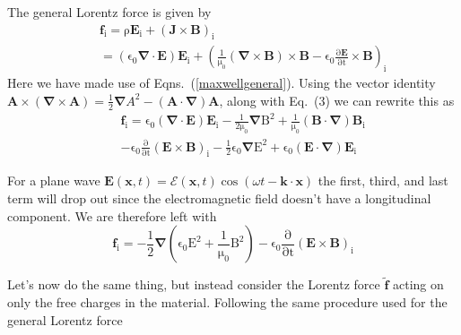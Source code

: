 The general Lorentz force is given by
\begin{eqnarray}
&&\mathrm{\mathbf{f}_i=\rho \mathbf{E}_i+\left(\mathbf{J} \times \mathbf{B}\right)_i}\nonumber \\
&&=\mathrm{\left(\epsilon_0\mathbf{\nabla} \cdot \mathbf{E}\right)\mathbf{E}_i+\left(\frac{1}{\mu_0}\left(\mathbf{\nabla}\times \mathbf{B}\right)\times\mathbf{B}-\epsilon_0\frac{\partial \mathbf{E}}{\partial t} \times \mathbf{B}\right)_i}
\label{maxwellmatter}
\end{eqnarray}
Here we have made use of Eqns.\ (\ref{maxwellgeneral}).  Using the vector identity $\mathbf{A}\times\left(\mathbf{\nabla}\times \mathbf{A}\right)=\frac{1}{2}\mathbf{\nabla}A^2-\left(\mathbf{A}\cdot\mathbf{\nabla}\right)\mathbf{A}$, along with Eq.\ (3) we can rewrite this as
\begin{eqnarray}
&&\mathrm{\mathbf{f}_i=\epsilon_0\left(\mathbf{\nabla} \cdot \mathbf{E}\right)\mathbf{E}_i-\frac{1}{2\mu_0}\mathbf{\nabla}B^2+\frac{1}{\mu_0}\left(\mathbf{B}\cdot\mathbf{\nabla}\right)\mathbf{B}_i} \nonumber \\
&&\mathrm{-\epsilon_0\frac{\partial}{\partial t} \left(\mathbf{E}\times \mathbf{B}\right)_i-\frac{1}{2}\epsilon_0\mathbf{\nabla}E^2+\epsilon_0\left(\mathbf{E}\cdot\mathbf{\nabla}\right)\mathbf{E}_i}
\end{eqnarray}

For a plane wave $\mathbf{E}(\mathbf{x},t)=\mathbf{\mathcal{E}}(\mathbf{x},t)\cos{(\omega t -\mathbf{k\cdot x})}$ the first, third, and last term will drop out since the electromagnetic field doesn't have a longitudinal component.  We are therefore left with
\begin{equation}
\mathrm{\mathbf{f}_i=-\frac{1}{2}\mathbf{\nabla}\left(\epsilon_0 E^2+\frac{1}{\mu_0}B^2\right)-\epsilon_0\frac{\partial}{\partial t} \left(\mathbf{E}\times \mathbf{B}\right)_i}
\label{generalforce}
\end{equation}

Let's now do the same thing, but instead consider the Lorentz force $\tilde{\mathbf{f}}$ acting on only the free charges in the material.  Following the same procedure used for the general Lorentz force

